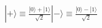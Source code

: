 \documentclass[preview]{standalone}
\begin{document}
\begin{align*}
|+\rangle  \equiv \frac{|0\rangle + |1\rangle}{\sqrt{2}}  |-\rangle  \equiv \frac{|0\rangle - |1\rangle}{\sqrt{2}}
\end{align*}
\end{document}
